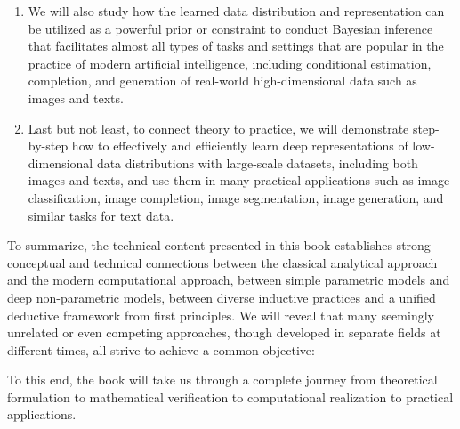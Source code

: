 \documentclass[../../book-main.tex]{subfiles}
\begin{document}
\begin{enumerate}
\item We will also study how the learned data distribution and representation can be utilized as a powerful prior or constraint to conduct Bayesian inference that facilitates almost all types of tasks and settings that are popular in the practice of modern artificial intelligence, including conditional estimation, completion, and generation of real-world high-dimensional data such as images and texts. 

\item Last but not least, to connect theory to practice, we will demonstrate step-by-step how to effectively and efficiently learn deep representations of low-dimensional data distributions with large-scale datasets, including both images and texts, and use them in many practical applications such as image classification, image completion, image segmentation, image generation, and similar tasks for text data. 
\end{enumerate}

To summarize, the technical content presented in this book establishes strong conceptual and technical connections between the classical analytical approach and the modern computational approach, between simple parametric models and deep non-parametric models, between diverse inductive practices and a unified deductive framework from first principles. We will reveal that many seemingly unrelated or even competing approaches, though developed in separate fields at different times, all strive to achieve a common objective: 
\begin{quote}
\end{quote}
To this end, the book will take us through a complete journey from theoretical formulation to mathematical verification to computational realization to practical applications.
\end{document}
